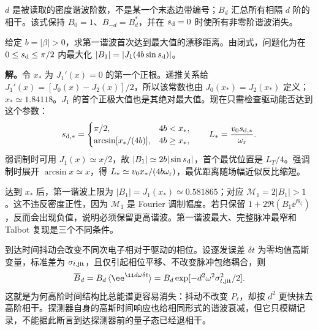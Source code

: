 $d$ 是被读取的密度谐波阶数，不是某一个末态边带编号；$B_d$ 汇总所有相隔 $d$ 阶的相干。该式保持 $B_0=1$、$B_{-d}=B_d^*$，并在 $s_{\rm d}=0$ 时使所有非零阶谐波消失。

\begin{exbox}
给定 $b=|\beta|>0$，求第一谐波首次达到最大值的漂移距离。由闭式，问题化为在 $0\le s_{\rm d}\le\pi/2$ 内最大化
$|B_1|=|J_1(4b\sin s_{\rm d})|$。

\textbf{解。}令 $x_*$ 为 $J_1'(x)=0$ 的第一个正根。递推关系给
$J_1'(x)=[J_0(x)-J_2(x)]/2$，所以该常数也由 $J_0(x_*)=J_2(x_*)$ 定义；$x_*\simeq1.84118$。$J_1$ 的首个正极大值也是其绝对最大值。现在只需检查驱动能否达到这个参数：
\begin{equation}
 s_{\rm d,*}=\begin{cases}
 \pi/2,&4b<x_*,\\
 \arcsin[x_*/(4b)],&4b\ge x_*,
 \end{cases}\qquad
 L_* =\frac{v_0s_{\rm d,*}}{\omega_{\rm r}}.
\label{eq:feqo-optimal-drift}
\end{equation}
弱调制时可用 $J_1(x)\simeq x/2$，故 $|B_1|\simeq2b|\sin s_{\rm d}|$，首个最优位置是 $L_T/4$。强调制时展开 $\arcsin x\simeq x$，得
$L_*\simeq v_0x_*/(4b\omega_{\rm r})$，最优距离随场幅近似反比缩短。

达到 $x_*$ 后，第一谐波上限为 $|B_1|=J_1(x_*)\simeq0.581865$；对应 $\mathcal M_1=2|B_1|>1$。这不违反密度正性，因为 $\mathcal M_1$ 是 Fourier 调制幅度。若只保留 $1+2\Re(B_1\ee^{\ii\theta_\zeta})$，反而会出现负值，说明必须保留更高谐波。第一谐波最大、完整脉冲最窄和 Talbot 复现是三个不同条件。
\end{exbox}

到达时间抖动会改变不同次电子相对于驱动的相位。设逐发误差 $\delta t$ 为零均值高斯变量，标准差为 $\sigma_{t,\rm jit}$，且仅引起相位平移、不改变脉冲包络耦合，则
\begin{equation}
 \overline B_d=B_d\,\langle\ee^{\ii d\omega\delta t}\rangle
 =B_d\exp[-d^2\omega^2\sigma_{t,\rm jit}^2/2].
 \label{eq:electron-bunching-jitter-transfer}
\end{equation}
这就是为何高阶时间结构比总能谱更容易消失：抖动不改变 $P_\ell$，却按 $d^2$ 更快抹去高阶相干。探测器自身的高斯时间响应也给相同形式的谐波衰减，但它只模糊记录，不能据此断言到达探测器前的量子态已经退相干。


